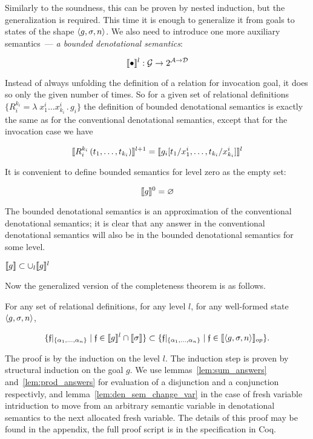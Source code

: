 Similarly to the soundness, this can be proven by nested induction, but the generalization is required. This time it is enough to generalize it from goals
to states of the shape $\left<{g, \sigma, n}\right>$. We also need to introduce one more auxiliary semantics~--- \emph{a bounded denotational semantics}:

\[
\llbracket{\bullet}\rrbracket^l : \mathcal{G} \to 2^{\mathcal{A}\to\mathcal{D}}
\]

Instead of always unfolding the definition of a relation for invocation goal, it does so only the given number of times. So for a given set of relational
definitions $\{R_i^{k_i} = \lambda\;x_1^i\dots x_{k_i}^i\,.\, g_i\}$ the definition of bounded denotational semantics is exactly the same as for the conventional denotational semantics, except that for the invocation case we have

\[
\llbracket{R_i^{k_i}\,(t_1,\dots,t_{k_i})}\rrbracket^{l+1} = \llbracket{g_i[t_1/x_1^i, \dots, t_{k_i}/x_{k_i}^i]}\rrbracket^{l}
\]

It is convenient to define bounded semantics for level zero as the empty set:

\[
\llbracket{g}\rrbracket^{0} = \varnothing
\]

The bounded denotational semantics is an approximation of the conventional denotational semantics; it is clear that any answer in the conventional denotational semantics will also be in the bounded denotational semantics for some level.

\begin{lemma}
$\llbracket{g}\rrbracket \subset \cup_l \llbracket{g}\rrbracket^l$
\end{lemma}

Now the generalized version of the completeness theorem is as follows.

\begin{lemma}
\label{lem:gen_completeness}
For any set of relational definitions, for any level $l$, for any well-formed state $\left<{g, \sigma, n}\right>$,

\[
\{\mathfrak{f}|_{\{\alpha_1,\dots,\alpha_n\}} \mid \mathfrak{f} \in \llbracket{g}\rrbracket^l \cap \llbracket{\sigma}\rrbracket\} \subset \{\mathfrak{f}|_{\{\alpha_1,\dots,\alpha_n\}} \mid \mathfrak{f} \in \llbracket{\left<{g, \sigma, n}\right>}\rrbracket_{op}\}.
\]
\end{lemma}

The proof is by the induction on the level $l$. The induction step is proven by structural induction on the goal $g$. We use lemmas~\ref{lem:sum_answers} and~\ref{lem:prod_answers} for evaluation of a disjunction and a conjunction respectivly, and lemma~\ref{lem:den_sem_change_var} in the case of fresh variable intriduction to move from an arbitrary semantic variable in denotational semantics to the next allocated fresh variable. The details of this proof may be found in the appendix, the full proof script is in the specification in Coq.
